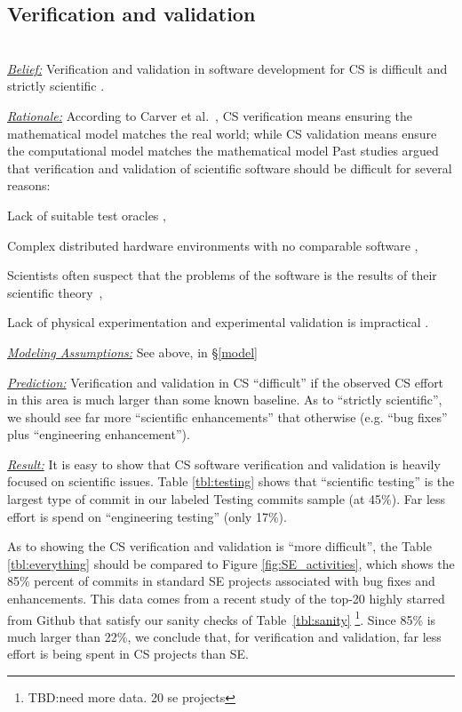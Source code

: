 \subsection{Verification and validation}~\\
\noindent \textit{\underline{Belief:}} 
Verification and validation in software development for CS is difficult and strictly scientific \cite{carver07_environment, kanewala13_testing, carver06_hpc, Prabhu11_cssurvey, basili08_hpc}.

\noindent \textit{\underline{Rationale:}} 
According to Carver et al.~\cite{carver07_environment},
CS verification means ensuring the mathematical model matches the real world; while CS validation means ensure the computational model matches the mathematical model  Past studies argued that verification and validation of scientific software
should be  difficult for  several reasons:

\bi
    \item Lack of suitable test oracles \cite{kanewala13_testing},
    \item Complex distributed hardware environments with no comparable software \cite{basili08_hpc},
    \item Scientists often suspect that the problems of the software is the results of their scientific theory~\cite{faulk09_secs},
    \item Lack of physical experimentation and experimental validation is impractical \cite{carver07_environment}. 
\ei

\noindent \textit{\underline{Modeling Assumptions:}} See  above, in \S\ref{model}

\noindent \textit{\underline{Prediction:}}
Verification and validation in CS
``difficult'' if the observed CS effort in this area
is much larger than some known baseline.  As to ``strictly scientific'', we should see far more ``scientific
enhancements'' that otherwise (e.g. ``bug fixes'' plus ``engineering enhancement''). 

\noindent \textit{\underline{Result:}}
It is easy to show that CS software verification and validation is heavily  focused on scientific issues.
Table \ref{tbl:testing} shows that ``scientific testing'' is the largest type of commit in our labeled Testing commits sample (at 45\%).  Far less effort is spend on ``engineering testing'' (only 17\%). 


As to showing the CS verification and validation is ``more difficult'',
the Table \ref{tbl:everything} should be compared to Figure \ref{fig:SE_activities}, which shows the 85\% percent  of commits in standard SE projects
 associated with bug fixes and enhancements.  This data comes from a recent study of the top-20 highly starred from Github that satisfy our sanity checks of Table~\ref{tbl:sanity} \footnote{TBD:need more data. 20 se projects}.
Since 85\% is much larger than 22\%, we conclude that, for verification and validation, 
far less effort is being spent in CS projects than SE.

